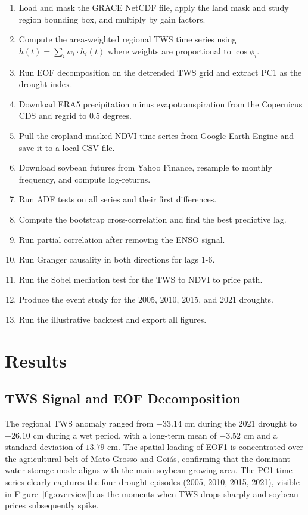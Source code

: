 \documentclass[6pt, twocolumn]{article}
\begin{document}
{\small\begin{enumerate}[leftmargin=1.4em, itemsep=0pt, topsep=1pt, parsep=0pt]
  \item Load and mask the GRACE NetCDF file, apply the land mask and
        study region bounding box, and multiply by gain factors.
  \item Compute the area-weighted regional TWS time series using
        $\bar{h}(t) = \sum_i w_i \cdot h_i(t)$ where weights are
        proportional to $\cos\phi_i$.
  \item Run EOF decomposition on the detrended TWS grid and extract
        PC1 as the drought index.
  \item Download ERA5 precipitation minus evapotranspiration from
        the Copernicus CDS and regrid to 0.5 degrees.
  \item Pull the cropland-masked NDVI time series from Google Earth
        Engine and save it to a local CSV file.
  \item Download soybean futures from Yahoo Finance, resample to
        monthly frequency, and compute log-returns.
  \item Run ADF tests on all series and their first differences.
  \item Compute the bootstrap cross-correlation and find the best
        predictive lag.
  \item Run partial correlation after removing the ENSO signal.
  \item Run Granger causality in both directions for lags 1-6.
  \item Run the Sobel mediation test for the TWS to NDVI to price path.
  \item Produce the event study for the 2005, 2010, 2015, and 2021
        droughts.
  \item Run the illustrative backtest and export all figures.
\end{enumerate}}

\FloatBarrier
\section{Results}
\label{sec:results}

\subsection{TWS Signal and EOF Decomposition}

The regional TWS anomaly ranged from $-33.14$ cm during the 2021
drought to $+26.10$ cm during a wet period, with a long-term mean
of $-3.52$ cm and a standard deviation of $13.79$ cm. The spatial
loading of EOF1 is concentrated over the agricultural belt of Mato
Grosso and Goiás, confirming that the dominant water-storage mode
aligns with the main soybean-growing area. The PC1 time series clearly
captures the four drought episodes (2005, 2010, 2015, 2021), visible
in Figure~\ref{fig:overview}b as the moments when TWS drops sharply
and soybean prices subsequently spike.
\end{document}
